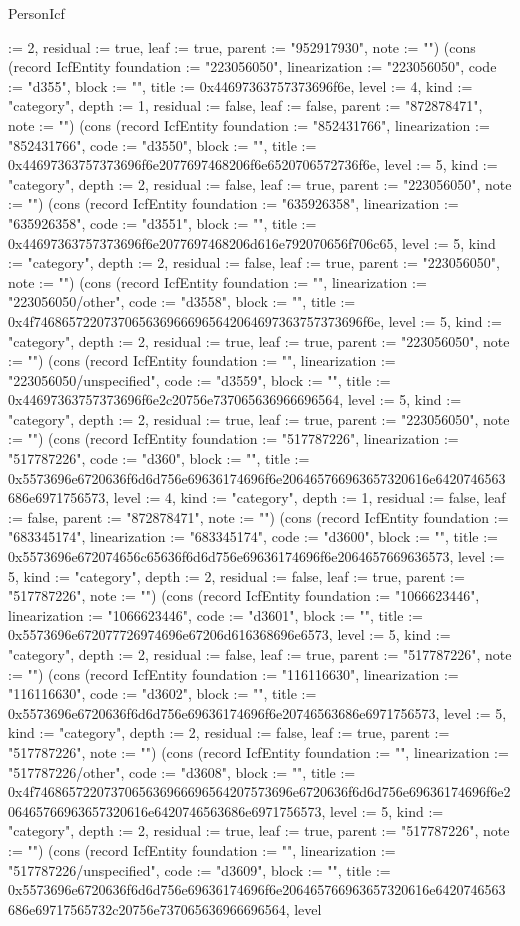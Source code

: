 \begin{lexlean}{PersonIcf}
\begin{semanticmodule}
{:= 2, residual := true, leaf := true, parent := "952917930", note := ""}) (cons (record IcfEntity {foundation := "223056050", linearization := "223056050", code := "d355", block := "", title := 0x44697363757373696f6e, level := 4, kind := "category", depth := 1, residual := false, leaf := false, parent := "872878471", note := ""}) (cons (record IcfEntity {foundation := "852431766", linearization := "852431766", code := "d3550", block := "", title := 0x44697363757373696f6e2077697468206f6e6520706572736f6e, level := 5, kind := "category", depth := 2, residual := false, leaf := true, parent := "223056050", note := ""}) (cons (record IcfEntity {foundation := "635926358", linearization := "635926358", code := "d3551", block := "", title := 0x44697363757373696f6e2077697468206d616e792070656f706c65, level := 5, kind := "category", depth := 2, residual := false, leaf := true, parent := "223056050", note := ""}) (cons (record IcfEntity {foundation := "", linearization := "223056050/other", code := "d3558", block := "", title := 0x4f74686572207370656369666965642064697363757373696f6e, level := 5, kind := "category", depth := 2, residual := true, leaf := true, parent := "223056050", note := ""}) (cons (record IcfEntity {foundation := "", linearization := "223056050/unspecified", code := "d3559", block := "", title := 0x44697363757373696f6e2c20756e737065636966696564, level := 5, kind := "category", depth := 2, residual := true, leaf := true, parent := "223056050", note := ""}) (cons (record IcfEntity {foundation := "517787226", linearization := "517787226", code := "d360", block := "", title := 0x5573696e6720636f6d6d756e69636174696f6e206465766963657320616e6420746563686e6971756573, level := 4, kind := "category", depth := 1, residual := false, leaf := false, parent := "872878471", note := ""}) (cons (record IcfEntity {foundation := "683345174", linearization := "683345174", code := "d3600", block := "", title := 0x5573696e672074656c65636f6d6d756e69636174696f6e2064657669636573, level := 5, kind := "category", depth := 2, residual := false, leaf := true, parent := "517787226", note := ""}) (cons (record IcfEntity {foundation := "1066623446", linearization := "1066623446", code := "d3601", block := "", title := 0x5573696e672077726974696e67206d616368696e6573, level := 5, kind := "category", depth := 2, residual := false, leaf := true, parent := "517787226", note := ""}) (cons (record IcfEntity {foundation := "116116630", linearization := "116116630", code := "d3602", block := "", title := 0x5573696e6720636f6d6d756e69636174696f6e20746563686e6971756573, level := 5, kind := "category", depth := 2, residual := false, leaf := true, parent := "517787226", note := ""}) (cons (record IcfEntity {foundation := "", linearization := "517787226/other", code := "d3608", block := "", title := 0x4f7468657220737065636966696564207573696e6720636f6d6d756e69636174696f6e206465766963657320616e6420746563686e6971756573, level := 5, kind := "category", depth := 2, residual := true, leaf := true, parent := "517787226", note := ""}) (cons (record IcfEntity {foundation := "", linearization := "517787226/unspecified", code := "d3609", block := "", title := 0x5573696e6720636f6d6d756e69636174696f6e206465766963657320616e6420746563686e69717565732c20756e737065636966696564, level }
\end{semanticmodule}
\end{lexlean}
